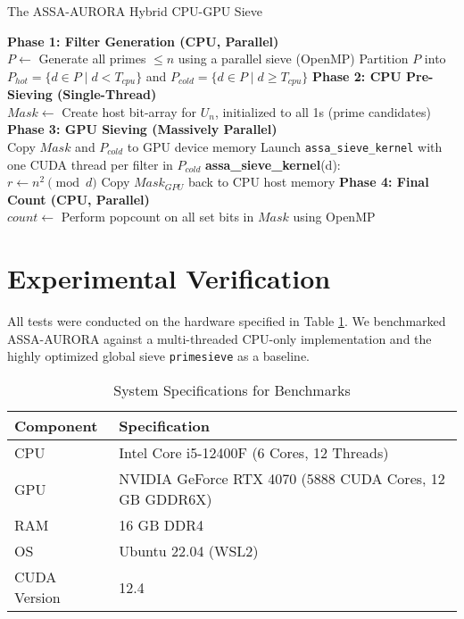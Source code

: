 \documentclass[11pt]{article}
\begin{document}
\begin{algorithm}[H]
\caption{The ASSA-AURORA Hybrid CPU-GPU Sieve}
\label{alg:assa_aurora}
\BlankLine
\textbf{Phase 1: Filter Generation (CPU, Parallel)}\\
$P \leftarrow$ Generate all primes $\leq n$ using a parallel sieve (OpenMP)\;
Partition $P$ into $P_{hot} = \{d \in P \mid d < T_{cpu}\}$ and $P_{cold} = \{d \in P \mid d \geq T_{cpu}\}$\;
\BlankLine
\textbf{Phase 2: CPU Pre-Sieving (Single-Thread)}\\
$Mask \leftarrow$ Create host bit-array for $U_n$, initialized to all 1s (prime candidates)\;
\BlankLine
\textbf{Phase 3: GPU Sieving (Massively Parallel)}\\
Copy $Mask$ and $P_{cold}$ to GPU device memory\;
Launch \texttt{assa\_sieve\_kernel} with one CUDA thread per filter in $P_{cold}$\;
\Indp
\textbf{assa\_sieve\_kernel}(d):\\
    $r \leftarrow n^2 \pmod{d}$\;
\Indm
Copy $Mask_{GPU}$ back to CPU host memory\;
\BlankLine
\textbf{Phase 4: Final Count (CPU, Parallel)}\\
$count \leftarrow$ Perform popcount on all set bits in $Mask$ using OpenMP\;
\;
\end{algorithm}

\section{Experimental Verification}

All tests were conducted on the hardware specified in Table \ref{tab:specs}. We benchmarked ASSA-AURORA against a multi-threaded CPU-only implementation and the highly optimized global sieve \texttt{primesieve} as a baseline.

\begin{table}[h!]
\centering \caption{System Specifications for Benchmarks} \label{tab:specs}
\begin{tabular}{ll}
\toprule \textbf{Component} & \textbf{Specification} \\ \midrule
CPU & Intel Core i5-12400F (6 Cores, 12 Threads) \\
GPU & NVIDIA GeForce RTX 4070 (5888 CUDA Cores, 12 GB GDDR6X) \\
RAM & 16 GB DDR4 \\
OS & Ubuntu 22.04 (WSL2) \\
CUDA Version & 12.4 \\
\bottomrule
\end{tabular}
\end{table}
\end{document}
